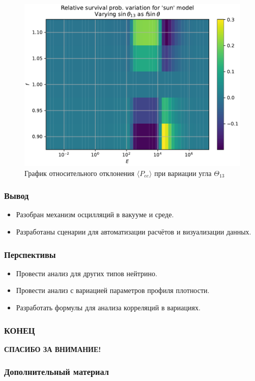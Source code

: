 \documentclass[utf8,9pt,mathserif,usepdftitle=false]{beamer}
\begin{document}
\begin{frame}
	\begin{figure}[h]
		\centering
		\includegraphics[width=0.8\linewidth]{sun-in-ang13}
		\caption{График относительного отклонения \(\langle P_{ee}\rangle\) при вариации угла \(\Theta_{13}\)}
	\end{figure}
\end{frame}

\begin{frame}

	\frametitle{Вывод}
    \begin{itemize}
        \item<1-> Разобран механизм осцилляций в вакууме и среде.
        \item<2-> Разработаны сценарии для автоматизации расчётов и визуализации данных.
    \end{itemize}
\end{frame}
\begin{frame}
    \frametitle{Перспективы}
    \begin{itemize}
        \item<1-> Провести анализ для других типов нейтрино.
        \item<2-> Провести анализ с вариацией параметров профиля плотности.
        \item<3-> Разработать формулы для анализа корреляций в вариациях.
    \end{itemize}
\end{frame}
\begin{frame}
  \frametitle{КОНЕЦ}
  \LARGE\centering\bfseries
  СПАСИБО ЗА ВНИМАНИЕ!
\end{frame}

\begin{frame}
  \frametitle{Дополнительный материал}
\end{frame}
\end{document}
